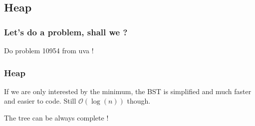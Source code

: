 \documentclass[10pt,svgnames,usenames,table]{beamer} %
\newcommand{\bigoh}{\mathcal{O}}
\begin{document}
\subsection{Heap}
\begin{frame}
  \frametitle{Let's do a problem, shall we ?}
  Do problem 10954 from uva !
\end{frame}
\begin{frame}
  \frametitle{Heap}
  If we are only interested by the minimum, the BST is simplified and much faster and easier to code.
  Still $\bigoh(\log(n))$ though.

  The tree can be always complete !
  \begin{center}
  \end{center}
\end{frame}
\end{document}
